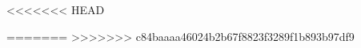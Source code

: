 \documentclass[a4paper]{article}
\begin{document}





<<<<<<< HEAD


=======
>>>>>>> c84baaaa46024b2b67f8823f3289f1b893b97df9
\end{document}
